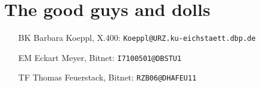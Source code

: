 \section{The good guys and dolls}
\begin{itemize}
\item[BK] Barbara Koeppl, X.400: {\tt Koeppl@URZ.ku-eichstaett.dbp.de}
\item[EM] Eckart Meyer, Bitnet: {\tt I7100501@DBSTU1}
\item[TF] Thomas Feuerstack, Bitnet: {\tt RZB06@DHAFEU11}
\end{itemize}

